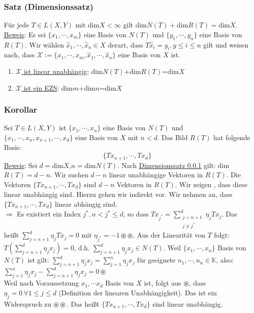 \subsubsection{Satz (Dimensionssatz)}
\label{dimension}
Für jede $T\in L(X,Y)$ mit dim$X<\infty$ gilt dim$N(T)+$dim$R(T)=$dim$X$.\\
\underline{Beweis}: Es sei $\{x_1,\cdots ,x_m\}$ eine Basis von $N(T)$ und $\{y_1,\cdots ,y_n\}$ eine Basis von $R(T)$.  Wir wählen $\hat{x}_1,\cdots ,\hat{x}_n \in X$ derart, dass $T\hat{x}_i=y_i,y\leq i\leq n$ gilt und weisen nach, dass $\mathcal{X}:=\{x_1,\cdots ,x_m,\hat{x}_1,\cdots ,\hat{x}_n\}$ eine Basis von $X$ ist.
\renewcommand{\labelenumi}{(\roman{enumi})}
\begin{enumerate}
\item \underline{$\mathcal{X}$ ist linear unabhängig}: dim$N(T)$+dim$R(T)$=dim$X$
\item \underline{$\mathcal{X}$ ist ein EZS}: dim$m$+dim$n$=dim$X$
\end{enumerate}
\subsubsection{Korollar}
Sei $T\in L(X,Y)$ ist $\{x_1,\cdots ,x_n\}$ eine Basis von $N(T)$ und $\{x_1,\cdots ,x_n,x_{n+1},\cdots ,x_d\}$ eine Basis von $X$ mit $n<d$.  Das Bild $R(T)$ hat folgende Basis:
\[\{Tx_{n+1},\cdots ,Tx_d\}\]
\underline{Beweis}:  Sei $d=$dim$X$,$n=$dim$N(T)$.  Nach \hyperref[dimension]{Dimensionssatz \ref*{dimension}} gilt:
dim$R(T)=d-n$.  Wir suchen $d-n$ linear unabhängige Vektoren in $R(T)$.  Die Vektoren $\{Tx_{n+1},\cdots ,Tx_d\}$ sind $d-n$ Vektoren in $R(T)$.  Wir zeigen , dass diese linear unabhängig sind. Hierzu gehen wir indirekt vor.  Wir nehmen an, dass $\{Tx_{n+1},\cdots ,Tx_d\}$ linear abhängig sind.\\
$\Rightarrow$ Es existiert ein Index $j^*,n<j^*\leq d$, so dass $Tx_{j^*}=\sum_{\substack{j=n+1\\ j\not= j^*}}^d \eta _jTx_j$.  Das heißt $\sum_{j=n+1}^d \eta _jTx_j=0$ mit $\eta _{j^*}=-1 \circledast\circledast$.  Aus der Linearität von $T$ folgt: $T(\sum_{j=n+1}^d \eta _jx_j)=0$, d.h. $\sum_{j=n+1}^d \eta _jx_j \in N(T)$.  Weil $\{ x_1,\cdots ,x_n\}$ Basis von $N(T)$ ist gilt: $\sum_{j=n+1}^d\eta _jx_j=\sum_{j=1}^n\eta _jx_j$ für geeignete $n_1,\cdots ,n_n\in\mathbb{K}$, also: $\sum_{j=1}^n\eta _jx_j-\sum_{j=n+1}^d\eta _jx_j=0 \circledast$\\
Weil nach Voraussetzung $x_1,\cdots x_d$ Basis von $X$ ist, folgt aus $\circledast$, dass $\eta _j=0\ \forall 1\leq j\leq d$ (Definition der linearen Unabhängigkeit).  Das ist ein Widerspruch zu $\circledast\circledast$.  Das heißt $\{Tx_{n+1},\cdots ,Tx_d\}$ sind linear unabhängig.
